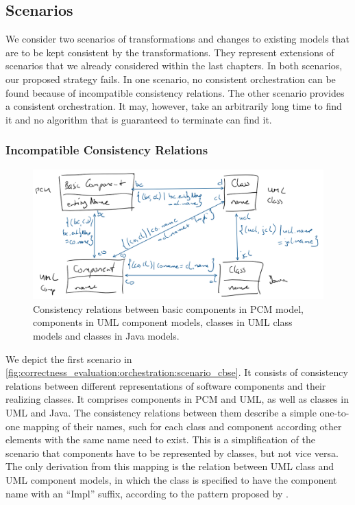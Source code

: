 \subsection{Scenarios}

We consider two scenarios of transformations and changes to existing models that are to be kept consistent by the transformations.
They represent extensions of scenarios that we already considered within the last chapters.
In both scenarios, our proposed strategy fails.
In one scenario, no consistent orchestration can be found because of incompatible consistency relations.
The other scenario provides a consistent orchestration. It may, however, take an arbitrarily long time to find it and no algorithm that is guaranteed to terminate can find it.


\subsubsection*{Incompatible Consistency Relations}

\begin{figure}
    \centering
    \includegraphics[width=\textwidth]{figures/correctness/evaluation/orchestration_scenario_cbse.png}
    \caption[Example scenario with incompatibility]{Consistency relations between basic components in \gls{PCM} model, components in \gls{UML} component models, classes in \gls{UML} class models and classes in Java models.}
    \label{fig:correctness_evaluation:orchestration:scenario_cbse}
\end{figure}

We depict the first scenario in \autoref{fig:correctness_evaluation:orchestration:scenario_cbse}.
It consists of consistency relations between different representations of software components and their realizing classes.
It comprises components in \gls{PCM} and \gls{UML}, as well as classes in \gls{UML} and Java.
The consistency relations between them describe a simple one-to-one mapping of their names, such for each class and component according other elements with the same name need to exist.
This is a simplification of the scenario that components have to be represented by classes, but not vice versa.
The only derivation from this mapping is the relation between \gls{UML} class and \gls{UML} component models, in which the class is specified to have the component name with an \enquote{Impl} suffix, according to the pattern proposed by \textcite{langhammer2017a}.


